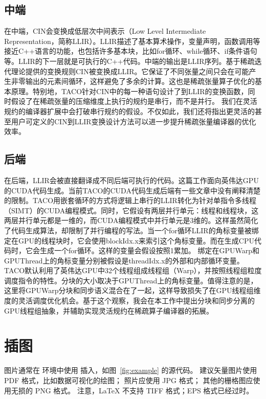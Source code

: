 \subsection{中端}
在中端，CIN会变换成低层次中间表示（Low Level Intermediate Representation，简称LLIR）。LLIR描述了基本算术操作，变量声明，函数调用等接近C++语言的功能，也包括许多基本块，比如for循环、while循环、if条件语句等。LLIR的下一层就是可执行的C++代码。中端的输出是LLIR序列。基于稀疏迭代理论\cite{kjolstad:2020:phd-thesis}提供的变换规则CIN被变换成LLIR。它保证了不同张量之间只会在可能产生非零输出的元素间循环，这样避免了多余的计算。这也是稀疏张量算子优化的基本原理。特别地，TACO针对CIN中的每一种语句设计了到LLIR的变换函数，同时假设了在稀疏张量的压缩维度上执行的规约是串行，而不是并行。
我们在灵活规约的编译器扩展中会打破串行规约的假设。不仅如此，我们还将指出更灵活的甚至用户可定义的CIN到LLIR变换设计方法可以进一步提升稀疏张量编译器的优化效率。
\subsection{后端}
在后端，LLIR会被直接翻译成不同后端可执行的代码。这篇工作面向英伟达GPU的CUDA代码生成。当前TACO的CUDA代码生成后端有一些文章中没有阐释清楚的限制。TACO用嵌套循环的方式\cite{senanayake:2020:scheduling}将逻辑上串行的LLIR转化为针对单指令多线程（SIMT）的CUDA编程模式。同时，它假设有两层并行单元：线程和线程块，这两层并行单元都是一维的，而CUDA编程模式中并行单元是3维的。这样虽然简化了代码生成算法，却限制了并行编程的写法。当一个for循环LLIR的角标变量被绑定在GPU的线程块时，它会使用blockIdx.x来索引这个角标变量。而在生成CPU代码时，它会生成一个for循环。这样的变量会假设按照1累加。
绑定在GPUWarp和GPUThread上的角标变量分别被假设是threadIdx.x的外部和内部循环变量。TACO默认利用了英伟达GPU中32个线程组成线程组（Warp），并按照线程组粒度调度指令的特性。分块的大小取决于GPUThread上的角标变量。值得注意的是，这里将GPUWarp分块和同步语义混合在了一起，这样导致损失了在GPU线程组维度的灵活调度优化机会。基于这个观察，我会在本工作中提出分块和同步分离的GPU线程组抽象，并辅助实现灵活规约在稀疏算子编译器的拓展。

\section{插图}

图片通常在  环境中使用  插入，如图~\ref{fig:example} 的源代码。
建议矢量图片使用 PDF 格式，比如数据可视化的绘图；
照片应使用 JPG 格式；
其他的栅格图应使用无损的 PNG 格式。
注意，LaTeX 不支持 TIFF 格式；EPS 格式已经过时。

